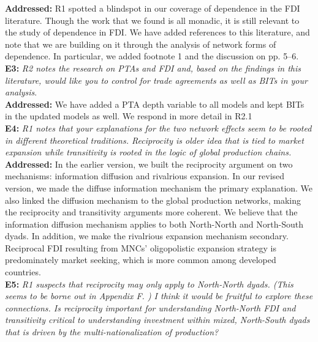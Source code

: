 \documentclass[a4paper,11pt]{texMemo}
\begin{document}
\noindent \textbf{Addressed:} R1 spotted a blindspot in our coverage of dependence in the FDI literature. Though the work that we found is all monadic, it is still relevant to the study of dependence in FDI. We have added references to this literature, and note that we are building on it through the analysis of network forms of dependence. In particular, we added footnote 1 and the discussion on pp. 5--6.  \\

\noindent \textbf{E3:} \emph{R2 notes the research on PTAs and FDI and, based on the findings in this literature, would like you to control for trade agreements as well as BITs in your analysis}.\\

\noindent \textbf{Addressed:} We have added a PTA depth variable to all models and kept BITs in the updated models as well. We respond in more detail in R2.1\\

\noindent \textbf{E4:} \emph{R1 notes that your explanations for the two network effects seem to be rooted in different theoretical traditions. Reciprocity is older idea that is tied to market expansion while transitivity is rooted in the logic of global production chains.} \\

\noindent \textbf{Addressed:}  %
In the earlier version, we built the reciprocity argument on two mechanisms: information diffusion and rivalrious expansion. In our revised version, we made the diffuse information mechanism the primary explanation. We also linked the diffusion mechanism to the global production networks, making the reciprocity and transitivity arguments more coherent. We believe that the information diffusion mechanism applies to both North-North and North-South dyads. In addition, we make the rivalrious expansion mechanism secondary. Reciprocal FDI resulting from MNCs' oligopolistic expansion strategy is predominately market seeking, which is more common among developed countries. \\

\noindent \textbf{E5:} \emph{R1 suspects that reciprocity may only apply to North-North dyads. (This seems to be borne out in Appendix F. ) I think it would be fruitful to explore these connections. Is reciprocity important for understanding North-North FDI and transitivity critical to understanding investment within mixed, North-South dyads that is driven by the multi-nationalization of production?}\\
\end{document}
